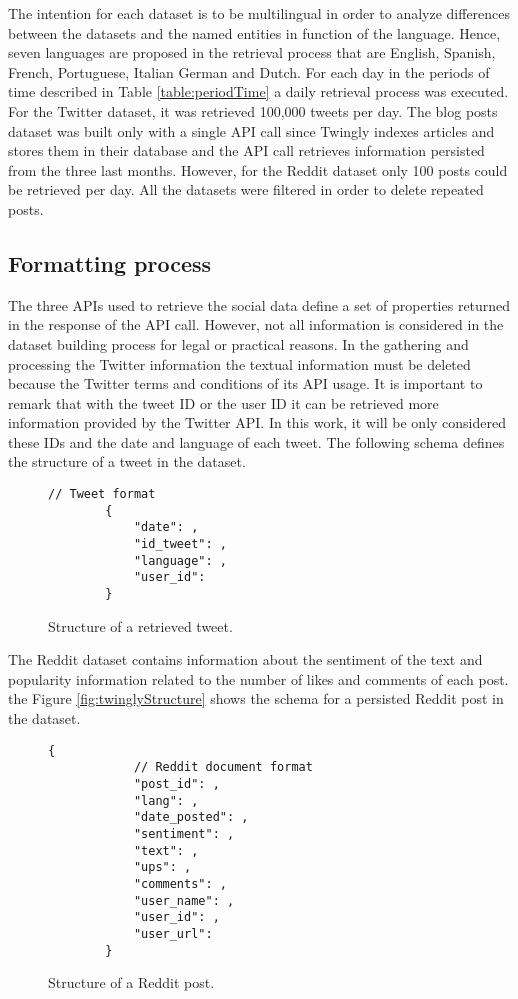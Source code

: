 \par 
The intention for each dataset is to be multilingual in order to analyze differences between the datasets and the named entities in function of the language. Hence, seven languages are proposed in the retrieval process that are English, Spanish, French, Portuguese, Italian German and Dutch.
For each day in the periods of time described in Table \ref{table:periodTime} a daily retrieval process was executed. For the Twitter dataset, it was retrieved 100,000 tweets per day. The blog posts dataset was built only with a single API call since Twingly indexes articles and stores them in their database and the API call retrieves information persisted from the three last months. However, for the Reddit dataset only 100 posts could be retrieved per day. All the datasets were filtered in order to delete repeated posts.
\subsection{Formatting process}
The three APIs used to retrieve the social data define a set of properties returned in the response of the API call. However, not all information is considered in the dataset building process for legal or practical reasons. In the gathering and processing the Twitter information the textual information must be deleted because the Twitter terms and conditions of its API usage. It is important to remark that with the tweet ID or the user ID it can be retrieved more information provided by the Twitter API. In this work, it will be only considered these IDs and the date and language of each tweet. The following schema defines the structure of a tweet in the dataset.
\begin{figure}[H]
	\begin{Verbatim}[xleftmargin=.5in]
		// Tweet format
		{
			"date": ,
			"id_tweet": ,
			"language": ,
			"user_id": 
		}
	\end{Verbatim}
	\caption{Structure of a retrieved tweet.}
\end{figure}


\par 

The Reddit dataset contains information about the sentiment of the text and popularity information related to the number of likes and comments of each post. the Figure \ref{fig:twinglyStructure} shows the schema for a persisted Reddit post in the dataset.
\begin{figure}[H]
	\begin{Verbatim}[xleftmargin=.5in]
		{
			// Reddit document format
			"post_id": ,
			"lang": ,
			"date_posted": ,
			"sentiment": ,
			"text": ,
			"ups": ,
			"comments": ,
			"user_name": ,
			"user_id": ,
			"user_url": 
		}
	\end{Verbatim}
	\caption{Structure of a Reddit post.}
	\label{fig:redditStructure}
\end{figure}

